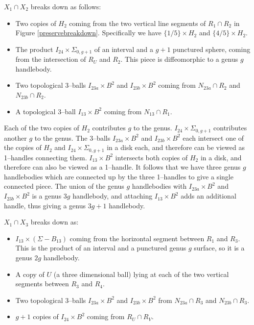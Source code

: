 \documentclass[12pt]{amsart}
\theoremstyle{definition}
\theoremstyle{remark}
\begin{document}
$X_1 \cap X_2$ breaks down as follows:

\begin{itemize}
\item Two copies of $H_2$ coming from the two vertical line segments of $R_1 \cap R_2$ in Figure \ref{preservebreakdown}.  Specifically we have $\{1/5\} \times H_2$ and $\{4/5\} \times H_2$.
\item The product $I_{24} \times \Sigma_{0,g+1}$ of an interval and a $g+1$ punctured sphere, coming from the intersection of $R_U$ and $R_2$.  This piece is diffeomorphic to a genus $g$ handlebody.
\item Two topological 3--balls $I_{23a} \times B^2$ and $I_{23b} \times B^2$ coming from $N_{23a} \cap R_2$ and $N_{23b} \cap R_2$.
\item A topological 3--ball $I_{13} \times B^2$ coming from $N_{13} \cap R_1$.
\end{itemize}

Each of the two copies of $H_2$ contributes $g$ to the genus.  $I_{24} \times \Sigma_{0,g+1}$ contributes another $g$ to the genus.  The 3--balls $I_{23a} \times B^2$ and $I_{23b} \times B^2$ each intersect one of the copies of $H_2$ and $I_{24} \times \Sigma_{0,g+1}$ in a disk each, and therefore can be viewed as 1--handles connecting them.  $I_{13} \times B^2$ intersects both copies of $H_2$ in a disk, and therefore can also be viewed as a 1--handle.  It follows that we have three genus $g$ handlebodies which are connected up by the three 1--handles to give a single connected piece.  The union of the genus $g$ handlebodies with $I_{23a} \times B^2$  and $I_{23b} \times B^2$ is a genus $3g$ handlebody, and attaching $I_{13} \times B^2$ adds an additional handle, thus giving a genus $3g+1$ handlebody.

$X_1 \cap X_3$ breaks down as:

\begin{itemize}
\item $I_{13} \times (\Sigma - B_{13})$ coming from the horizontal segment between $R_1$ and $R_3$.  This is the product of an interval and a punctured genus $g$ surface, so it is a genus $2g$ handlebody.  
\item A copy of $U$ (a three dimensional ball) lying at each of the two vertical segments between $R_3$ and $R_4$.
\item Two topological 3--balls $I_{23a} \times B^2$ and $I_{23b} \times B^2$ from $N_{23a} \cap R_3$ and $N_{23b} \cap R_3$.
\item $g+1$ copies of $I_{24} \times B^2$ coming from $R_U \cap R_V$.
\end{itemize}
\end{document}
